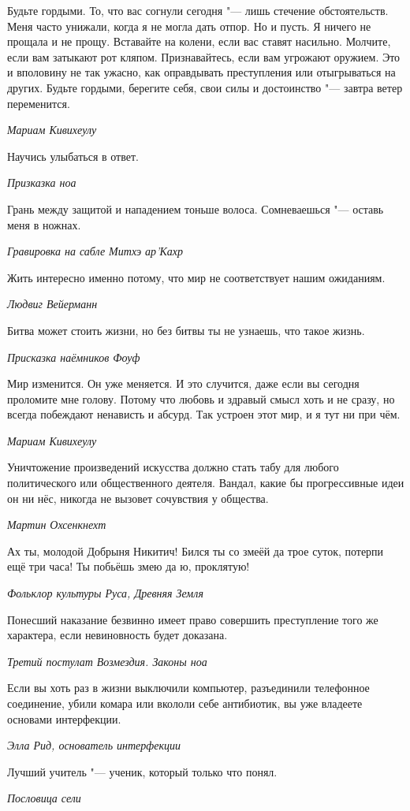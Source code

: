 \documentclass[a4paper,10pt]{book}
\newcommand{\mulang}[3]{#2}%
\begin{document}
\epigraph{Будьте гордыми. То, что вас согнули сегодня "--- лишь стечение обстоятельств. Меня часто унижали, когда я не могла дать отпор. Но и пусть. Я ничего не прощала и не прощу. Вставайте на колени, если вас ставят насильно. Молчите, если вам затыкают рот кляпом. Признавайтесь, если вам угрожают оружием. Это и вполовину не так ужасно, как оправдывать преступления или отыгрываться на других. Будьте гордыми, берегите себя, свои силы и достоинство "--- завтра ветер переменится.}
{\textit{Мариам Кивихеулу}}

\epigraph{Научись улыбаться в ответ.}
{\textit{Призказка ноа}}

\epigraph{Грань между защитой и нападением тоньше волоса. Сомневаешься "--- оставь меня в ножнах.}
{\textit{Гравировка на сабле Митхэ ар'Кахр}}

\epigraph{Жить интересно именно потому, что мир не соответствует нашим ожиданиям.}
{\textit{Людвиг Вейерманн}}

\epigraph{\mulang{}{Битва может стоить жизни, но без битвы ты не узнаешь, что такое жизнь.}
{Battle may take your life, but escaping battle you'll never know what life is.}}
{\textit{Присказка наёмников Фоуф}}

\epigraph{Мир изменится. Он уже меняется. И это случится, даже если вы сегодня проломите мне голову.
Потому что любовь и здравый смысл хоть и не сразу, но всегда побеждают ненависть и абсурд.
Так устроен этот мир, и я тут ни при чём.}
{\textit{Мариам Кивихеулу}}

\epigraph{Уничтожение произведений искусства должно стать табу для любого политического или общественного деятеля. Вандал, какие бы прогрессивные идеи он ни нёс, никогда не вызовет сочувствия у общества.}
{\textit{Мартин Охсенкнехт}}

\epigraph{Ах ты, молодой Добрыня Никитич! Бился ты со змеёй да трое суток, потерпи ещё три часа! Ты побьёшь змею да ю, проклятую!}
{\textit{Фольклор культуры Руса, Древняя Земля}}

\epigraph{Понесший наказание безвинно имеет право совершить преступление того же характера, если невиновность будет доказана.}
{\textit{Третий постулат Возмездия. Законы ноа}}

\epigraph{Если вы хоть раз в жизни выключили компьютер, разъединили телефонное соединение, убили комара или вкололи себе антибиотик, вы уже владеете основами интерфекции.}
{\textit{Элла Рид, основатель интерфекции}}

\epigraph{Лучший учитель "--- ученик, который только что понял.}
{\textit{Пословица сели}}
\end{document}
